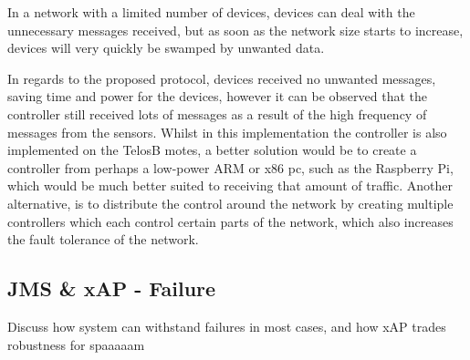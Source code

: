 In a network with a limited number of devices, devices can deal with the unnecessary messages received, but as soon as the network size starts to increase, devices will very quickly be swamped by unwanted data.

In regards to the proposed protocol, devices received no unwanted messages, saving time and power for the devices, however it can be observed that the controller still received lots of messages as a result of the high frequency of messages from the sensors. Whilst in this implementation the controller is also implemented on the TelosB motes, a better solution would be to create a controller from perhaps a low-power ARM or x86 pc, such as the Raspberry Pi, which would be much better suited to receiving that amount of traffic. Another alternative, is to distribute the control around the network by creating multiple controllers which each control certain parts of the network, which also increases the fault tolerance of the network.

\subsection{JMS \& xAP - Failure} %
\label{sub:jms_failure}
Discuss how system can withstand failures in most cases, and how xAP trades robustness for spaaaaam



